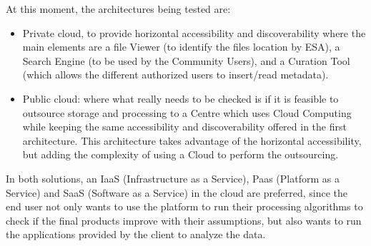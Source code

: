 At this moment, the architectures being tested are:
\begin{itemize}
\item Private cloud, to provide horizontal accessibility and discoverability where the main elements are a file Viewer (to identify the files location by ESA), a Search Engine (to be used by the Community Users), and a Curation Tool (which allows the different authorized users to insert/read metadata).
\item Public cloud: where what really needs to be checked is if it is feasible to outsource storage and processing to a Centre which uses Cloud Computing while keeping the same accessibility and discoverability offered in the first architecture. This architecture takes advantage of the horizontal accessibility, but adding the complexity of using a Cloud to perform the outsourcing.
\end{itemize}

In both solutions, an IaaS (Infrastructure as a Service), Paas (Platform as a Service) and SaaS (Software as a Service) in the cloud are preferred, since the end user not only wants to use the platform to run their processing algorithms to check if the final products improve with their assumptions, but also wants to run the applications provided by the client to analyze the data.


